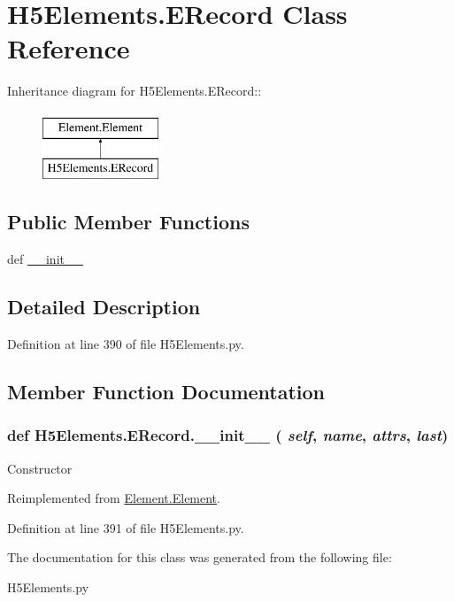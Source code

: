 \hypertarget{classH5Elements_1_1ERecord}{
\section{H5Elements.ERecord Class Reference}
\label{classH5Elements_1_1ERecord}
}
Inheritance diagram for H5Elements.ERecord::\begin{figure}[H]
\begin{center}
\leavevmode
\includegraphics[height=2cm]{classH5Elements_1_1ERecord}
\end{center}
\end{figure}
\subsection*{Public Member Functions}
\begin{DoxyCompactItemize}
\item 
def \hyperlink{classH5Elements_1_1ERecord_a11c91d973c319626d283c13a2679140b}{\_\-\_\-init\_\-\_\-}
\end{DoxyCompactItemize}


\subsection{Detailed Description}


Definition at line 390 of file H5Elements.py.

\subsection{Member Function Documentation}
\hypertarget{classH5Elements_1_1ERecord_a11c91d973c319626d283c13a2679140b}{
\subsubsection[{\_\-\_\-init\_\-\_\-}]{\setlength{\rightskip}{0pt plus 5cm}def H5Elements.ERecord.\_\-\_\-init\_\-\_\- ( {\em self}, \/   {\em name}, \/   {\em attrs}, \/   {\em last})}}
\label{classH5Elements_1_1ERecord_a11c91d973c319626d283c13a2679140b}
\begin{DoxyVerb}Constructor \end{DoxyVerb}
 

Reimplemented from \hyperlink{classElement_1_1Element_a359371465b7c4d21611adec7e86c3b33}{Element.Element}.

Definition at line 391 of file H5Elements.py.

The documentation for this class was generated from the following file:\begin{DoxyCompactItemize}
\item 
H5Elements.py\end{DoxyCompactItemize}

